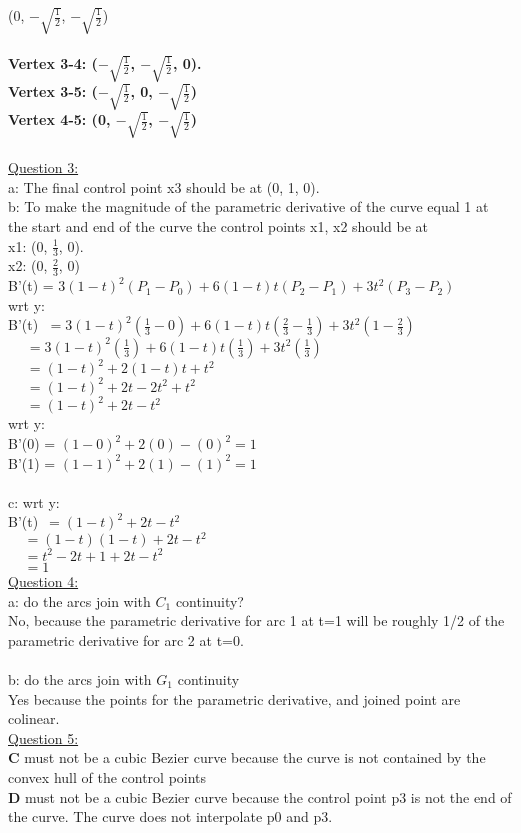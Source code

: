 \documentclass[12pt]{article}\usepackage{amsmath}
\begin{document}
 (0, $-\sqrt{\frac{1}{2}}$, $-\sqrt{\frac{1}{2}}$)\\
 \\
\textbf{Vertex 3-4: 
 ($-\sqrt{\frac{1}{2}}$, $-\sqrt{\frac{1}{2}}$, 0).\\
 Vertex 3-5:
 ($-\sqrt{\frac{1}{2}}$, 0, $-\sqrt{\frac{1}{2}}$)\\
 Vertex 4-5:
  (0, $-\sqrt{\frac{1}{2}}$, $-\sqrt{\frac{1}{2}}$)}\\
  \\
  \underline{Question 3:}\\
  a: The final control point x3 should be at (0, 1, 0).\\
  b: To make the magnitude of the parametric derivative of the curve equal 1 at the start and end of the curve the control points x1, x2 should be at\\
  x1: (0, $\frac{1}{3}$, 0).\\
  x2: (0, $\frac{2}{3}$, 0)\\
  B'(t) = $3 (1-t)^2(P_1 - P_0) + 6(1-t)t(P_2-P_1)+ 3t^2(P_3-P_2)$\\
  wrt y:\\
  B'(t) $\;= 3 (1-t)^2(\frac{1}{3} - 0) + 6(1-t)t(\frac{2}{3} - \frac{1}{3} )+ 3t^2(1 - \frac{2}{3})$\\
   \indent
    $\,\;\;\;\; = 3 (1-t)^2(\frac{1}{3}) + 6(1-t)t(\frac{1}{3})+ 3t^2(\frac{1}{3})$\\
\indent
   $\,\;\;\;\; = (1-t)^2 + 2(1-t)t + t^2$\\
      \indent
     $\,\;\;\;\; = (1-t)^2 + 2t - 2t^2 + t^2$\\
  \indent
 $\,\;\;\;\; = (1-t)^2 + 2t - t^2$\\
 wrt y:\\
 B'(0) = $(1-0)^2 + 2(0) - (0)^2 = 1$\\
 B'(1) = $(1-1)^2 + 2(1) - (1)^2 = 1$\\
 \\
 c: wrt y:\\
   B'(t) $\,= (1-t)^2 + 2t - t^2$\\
  \indent$\;\;\;\; = (1-t)(1-t) + 2t - t^2$\\
 \indent$\;\;\;\; = t^2 - 2t + 1 + 2t - t^2$\\
  \indent$\;\;\;\; = 1$\\
 
  \underline{Question 4:}\\
  a: do the arcs join with $C_1$ continuity?\\
  No, because the parametric derivative for arc 1 at t=1 will
  be roughly 1/2 of the parametric derivative for arc 2 at t=0.\\
\\
  b: do the arcs join with $G_1$ continuity\\
  Yes because the points for the parametric derivative, and joined point are colinear.\\
 \underline{Question 5:}\\
 \textbf{C} must not be a cubic Bezier curve because the curve is not contained by the convex hull of the control points\\
 \textbf{D} must not be a cubic Bezier curve because the control point p3 is not the end of the curve. The curve does not interpolate p0 and p3.
\end{document}
